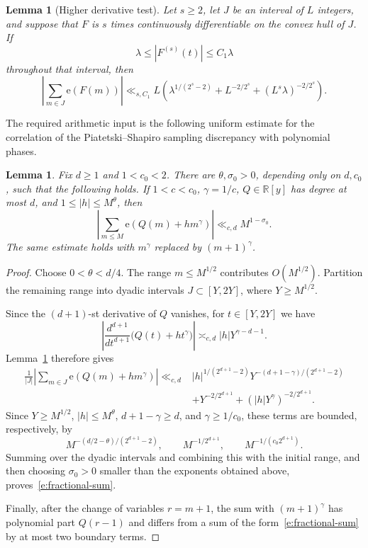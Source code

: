\documentclass{amsart}
\newcommand{\1}{\mathbf 1}
\newcommand{\e}{\mathrm e}
\newtheorem{lemma}[theorem]{Lemma}
\begin{document}
\begin{lemma}[Higher derivative test]\label{l:derivative-test}
Let $s\geq2$, let $J$ be an interval of $L$ integers, and suppose that
$F$ is $s$ times continuously differentiable on the convex hull of $J$.
If
\[
 \lambda\leq|F^{(s)}(t)|\leq C_1\lambda
\]
throughout that interval, then
\begin{equation}\label{e:derivative-test}
 \left|\sum_{m\in J}\e(F(m))\right|
 \ll_{s,C_1}L\left(\lambda^{1/(2^s-2)}+L^{-2/2^s}
 +(L^s\lambda)^{-2/2^s}\right).
\end{equation}
\end{lemma}

The required arithmetic input is the following uniform estimate for the
correlation of the Piatetski--Shapiro sampling discrepancy with
polynomial phases.

\begin{lemma}\label{l:fractional-phase}
Fix $d\geq1$ and $1<c_0<2$.  There are $\theta,\sigma_0>0$, depending
only on $d,c_0$, such that the following holds.  If $1<c<c_0$,
$\gamma=1/c$, $Q\in\mathbb R[y]$ has degree at most $d$, and
$1\leq|h|\leq M^\theta$, then
\begin{equation}\label{e:fractional-sum}
 \left|\sum_{m\leq M}\e(Q(m)+hm^\gamma)\right|
 \ll_{c,d}M^{1-\sigma_0}.
\end{equation}
The same estimate holds with $m^\gamma$ replaced by $(m+1)^\gamma$.
\end{lemma}

\begin{proof}
Choose $0<\theta<d/4$.  The range $m\leq M^{1/2}$ contributes
$O(M^{1/2})$.  Partition the remaining range into dyadic intervals
$J\subset[Y,2Y]$, where $Y\geq M^{1/2}$.

Since the $(d+1)$-st derivative of $Q$ vanishes, for $t\in[Y,2Y]$ we
have
\[
 \left|\frac{d^{d+1}}{dt^{d+1}}
 \bigl(Q(t)+ht^\gamma\bigr)\right|
 \asymp_{c,d}|h|Y^{\gamma-d-1}.
\]
Lemma~\ref{l:derivative-test} therefore gives
\begin{align*}
 \frac1{|J|}\left|\sum_{m\in J}\e(Q(m)+hm^\gamma)\right|
 \ll_{c,d}{}&
 |h|^{1/(2^{d+1}-2)}
 Y^{-(d+1-\gamma)/(2^{d+1}-2)}\\
 &+Y^{-2/2^{d+1}}+(|h|Y^\gamma)^{-2/2^{d+1}}.
\end{align*}
Since $Y\geq M^{1/2}$, $|h|\leq M^\theta$,
$d+1-\gamma\geq d$, and $\gamma\geq1/c_0$, these terms are bounded,
respectively, by
\[
 M^{-(d/2-\theta)/(2^{d+1}-2)},\qquad
 M^{-1/2^{d+1}},\qquad M^{-1/(c_0 2^{d+1})}.
\]
Summing over the dyadic intervals and combining this with the initial
range, and then choosing $\sigma_0>0$ smaller than the exponents
obtained above, proves~\eqref{e:fractional-sum}.

Finally, after the change of variables $r=m+1$, the sum with
$(m+1)^\gamma$ has polynomial part $Q(r-1)$ and differs from a sum of
the form~\eqref{e:fractional-sum} by at most two boundary terms.
\end{proof}
\end{document}
